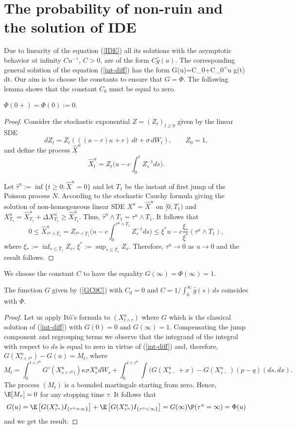 \section{The probability of non-ruin and the solution of IDE} 
Due to linearity of the equation (\ref{IDE}) all its solutions with the asymptotic behavior at infinity $C u^{-\gamma}$, $C>0$, are of the form $C\hat g(u)$. The corresponding general solution of the equation (\ref{int-diff}) has the form 
\beq
\label{GC0C}
G(u)=C_0+C\int_0^u \hat g(t)\,dt. 
\eeq
Our aim is to choose the constants to ensure that $G=\Phi$. The following lemma shows that the constant $C_0$ must be equal to zero.
\begin{lemma}
$\Phi(0+)=\Phi(0):=0$.
\end{lemma}
\begin{proof} 
Consider the stochastic exponential $Z=(Z_t)_{t\ge 0}$ given by the linear SDE 
$$
dZ_t=Z_t \left( ((a-r)\kappa + r) \,d t + \sigma \,dW_t \right), \qquad Z_0=1, 
$$
and define the process $\hat X^u$ 
$$
\hat X^u_t=Z_t\Big( u-c\int_0^t Z_s^{-1}ds\Big).
$$

Let $\hat \tau^ u:=\inf\{t\ge 0\colon \hat X^u=0\}$ and let $T_1$ be the instant of first jump of the Poisson process $N$. 
According to the stochastic Cauchy formula giving the solution of non-homogeneous linear SDE 
$X^u=\hat X^u$ on $[0,T_1)$ and $X^u_{T_1}=\hat X^u_{T_1}+\Delta X^u_{T_1}\ge \hat X^u_{T_1}$. Thus, $\hat \tau^ u\wedge T_1= \tau^ u\wedge T_1$. It follows that 
$$
0\le \hat X^u_{\tau^u\wedge T_1}=Z_{\tau^u\wedge T_1}\Big( u-c\int_0^{\tau^u\wedge T_1} Z_s^{-1}ds\Big)
\le \xi^* u-c\frac {\xi_*}{\xi^*}(\tau^u\wedge T_1),
$$
where $\xi_*:=\inf_{s\le T_1}Z_s$, $\xi^*:=\sup_{s\le T_1}Z_s$. Therefore, $\tau^ u\to 0$ as $u\to 0$ and the result follows.
\fdem
\end{proof} 

We choose the constant $C$ to have the equality $G(\infty)=\Phi(\infty) = 1 $.
 
\begin{lemma}
The function $G$ given by (\ref{GC0C}) with $C_0=0$ and $C=1/\int_0^\infty \hat g(s)\, ds$ coincides with $\Phi$. 
\end{lemma}
\begin{proof} Let us apply It\^o's formula to $(X^u_{t\wedge \tau})$ where $G$ which is the classical solution of (\ref{int-diff}) with $G(0)=0$ and $G(\infty)=1$. Compensating the jump component and regrouping terms we observe that the integrand of the integral with respect to $ds$ is equal to zero in virtue of (\ref{int-diff}) and, therefore, $G(X^u_{t\wedge \tau^u})-G(u)=M_t$, where 
$$
M_t=\int_0^{t\wedge \tau^u}G'(X^u_{s\wedge \tau^u)}) \kappa\sigma X^u_s dW_s+\int_0^{t\wedge \tau^u}\int (G(X^u_{s-}+x)-G(X^u_{s-})(p-q)(ds,dx). 
$$
The process $(M_t)$ is a bounded martingale starting from zero. Hence, $\E [M_\tau]=0$ for any stopping time $\tau$. 
It follows that 
$$
G(u)
= \E\left[ G(X^u_{\tau^u})I_{\{\tau^u=\infty\}}\right]+\E\left[ G(X^u_{\tau^u})I_{\{\tau^u<\infty\}}\right]=G(\infty)\P(\tau^u=\infty)=\Phi(u) 
$$ 
and we get the result. \fdem
\end{proof}

